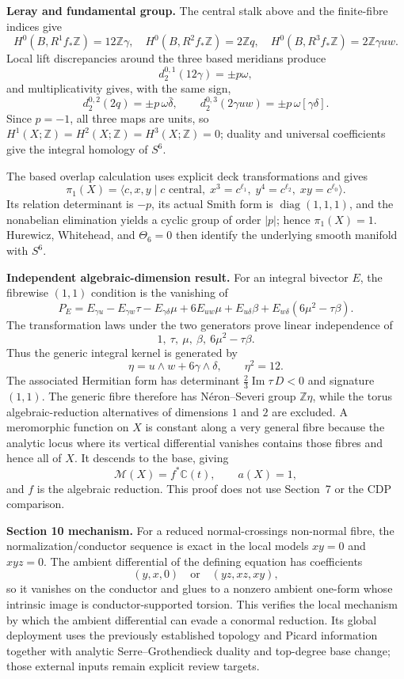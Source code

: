 \documentclass[9pt,letterpaper]{extarticle}
\newcommand{\Z}{\mathbb Z}
\newcommand{\C}{\mathbb C}
\newcommand{\M}{\mathcal M}
\begin{document}
\textbf{Leray and fundamental group.}
The central stalk above and the finite-fibre indices give
\[
H^0(B,R^1f_*\Z)=12\Z\gamma,\quad
H^0(B,R^2f_*\Z)=2\Z q,\quad
H^0(B,R^3f_*\Z)=2\Z\gamma uw.
\]
Local lift discrepancies around the three based meridians produce
\[
d_2^{0,1}(12\gamma)=\pm p\omega,
\]
and multiplicativity gives, with the same sign,
\[
d_2^{0,2}(2q)=\pm p\,\omega\bar\delta,
\qquad
d_2^{0,3}(2\gamma uw)=\pm p\,\omega[\gamma\delta].
\]
Since $p=-1$, all three maps are units, so $H^1(X;\Z)=H^2(X;\Z)=H^3(X;\Z)=0$; duality and universal coefficients give the integral homology of $S^6$.

The based overlap calculation uses explicit deck transformations and gives
\[
\pi_1(X)=\langle c,x,y\mid c\text{ central},\;x^3=c^{\ell_1},\;y^4=c^{\ell_2},\;xy=c^{\ell_0}\rangle.
\]
Its relation determinant is $-p$, its actual Smith form is $\operatorname{diag}(1,1,1)$, and the nonabelian elimination yields a cyclic group of order $|p|$; hence $\pi_1(X)=1$.  Hurewicz, Whitehead, and $\Theta_6=0$ then identify the underlying smooth manifold with $S^6$.

\newpage
\textbf{Independent algebraic-dimension result.}
For an integral bivector $E$, the fibrewise $(1,1)$ condition is the vanishing of
\[
P_E=E_{\gamma u}-E_{\gamma w}\tau-E_{\gamma\delta}\mu
 +6E_{uw}\mu+E_{u\delta}\beta+E_{w\delta}(6\mu^2-\tau\beta).
\]
The transformation laws under the two generators prove linear independence of
\[
1,\ \tau,\ \mu,\ \beta,\ 6\mu^2-\tau\beta.
\]
Thus the generic integral kernel is generated by
\[
\eta=u\wedge w+6\gamma\wedge\delta,\qquad \eta^2=12.
\]
The associated Hermitian form has determinant $\frac23\operatorname{Im}\tau\,D<0$ and signature $(1,1)$.  The generic fibre therefore has N\'eron--Severi group $\Z\eta$, while the torus algebraic-reduction alternatives of dimensions $1$ and $2$ are excluded.  A meromorphic function on $X$ is constant along a very general fibre because the analytic locus where its vertical differential vanishes contains those fibres and hence all of $X$.  It descends to the base, giving
\[
\M(X)=f^*\C(t),\qquad a(X)=1,
\]
and $f$ is the algebraic reduction.  This proof does not use Section~7 or the CDP comparison.

\textbf{Section 10 mechanism.}
For a reduced normal-crossings non-normal fibre, the normalization/conductor sequence is exact in the local models $xy=0$ and $xyz=0$.  The ambient differential of the defining equation has coefficients
\[
(y,x,0)\quad\text{or}\quad(yz,xz,xy),
\]
so it vanishes on the conductor and glues to a nonzero ambient one-form whose intrinsic image is conductor-supported torsion.  This verifies the local mechanism by which the ambient differential can evade a conormal reduction.  Its global deployment uses the previously established topology and Picard information together with analytic Serre--Grothendieck duality and top-degree base change; those external inputs remain explicit review targets.
\end{document}
